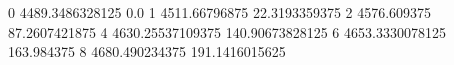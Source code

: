 0 4489.3486328125 0.0
1 4511.66796875 22.3193359375
2 4576.609375 87.2607421875
4 4630.25537109375 140.90673828125
6 4653.3330078125 163.984375
8 4680.490234375 191.1416015625
